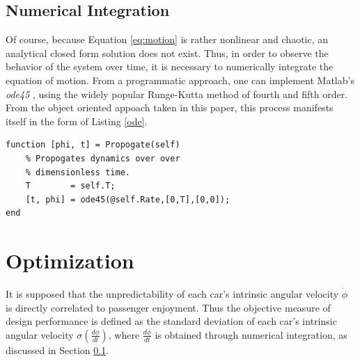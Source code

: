 \documentclass{article}
\begin{document}
\subsection{Numerical Integration} \label{sec:int}
Of course, because Equation \ref{eq:motion} is rather nonlinear and chaotic, an analytical closed form solution does not exist. Thus, in order to observe the behavior of the system over time, it is necessary to numerically integrate the equation of motion. From a programmatic approach, one can implement Matlab's \textit{ode45} \cite{Matlab}, using the widely popular Runge-Kutta method of fourth and fifth order. From the object oriented appoach taken in this paper, this process manifests itself in the form of Listing \ref{ode}.
\begin{lstlisting}[caption=Numerical Integration, label=ode]
function [phi, t] = Propogate(self)
    % Propogates dynamics over over
    % dimensionless time.
    T        = self.T;
    [t, phi] = ode45(@self.Rate,[0,T],[0,0]);
end
\end{lstlisting}

\section{Optimization}
It is supposed that the unpredictability of each car's intrinsic angular velocity $\dot{\phi}$ is directly correlated to passenger enjoyment. Thus the objective measure of design performance is defined as the standard deviation of each car's intrinsic angular velocity $\sigma\left(\frac{d\phi}{dt}\right)$, where $\frac{d\phi}{dt}$ is obtained through numerical integration, as discussed in Section \ref{sec:int}.
\end{document}
